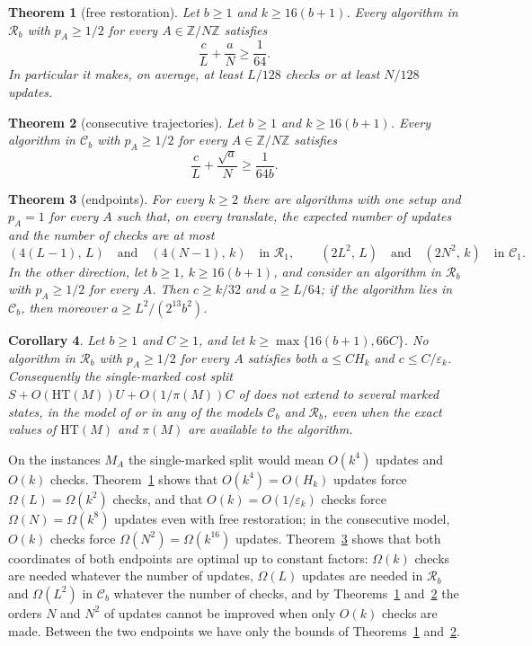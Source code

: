 \documentclass{amsart}
\theoremstyle{plain}
\newtheorem{theorem}{Theorem}[section]
\newtheorem{corollary}[theorem]{Corollary}
\theoremstyle{definition}
\theoremstyle{remark}
\newcommand{\Z}{\mathbb{Z}}
\newcommand{\eps}{\varepsilon}
\newcommand{\res}{\mathcal{R}}
\newcommand{\con}{\mathcal{C}}
\newcommand{\HT}{\mathrm{HT}}
\begin{document}
\begin{theorem}[free restoration]\label{thm:main}
Let $b\ge 1$ and $k\ge 16(b+1)$. Every algorithm in $\res_b$ with $p_A\ge 1/2$ for every $A\in\Z/N\Z$ satisfies
\[
\frac cL+\frac aN\ge \frac1{64}.
\]
In particular it makes, on average, at least $L/128$ checks or at least $N/128$ updates.
\end{theorem}

\begin{theorem}[consecutive trajectories]\label{thm:consecutive}
Let $b\ge 1$ and $k\ge 16(b+1)$. Every algorithm in $\con_b$ with $p_A\ge 1/2$ for every $A\in\Z/N\Z$ satisfies
\[
\frac cL+\frac{\sqrt a}{N}\ge \frac1{64b}.
\]
\end{theorem}

\begin{theorem}[endpoints]\label{thm:endpoints}
For every $k\ge 2$ there are algorithms with one setup and $p_A=1$ for every $A$ such that, on every translate, the expected number of updates and the number of checks are at most
\[
(4(L-1),\,L)\quad\text{and}\quad (4(N-1),\,k)\quad\text{in } \res_1,\qquad
(2L^2,\,L)\quad\text{and}\quad (2N^2,\,k)\quad\text{in } \con_1 .
\]
In the other direction, let $b\ge 1$, $k\ge 16(b+1)$, and consider an algorithm in $\res_b$ with $p_A\ge 1/2$ for every $A$. Then $c\ge k/32$ and $a\ge L/64$; if the algorithm lies in $\con_b$, then moreover $a\ge L^2/(2^{13}b^2)$.
\end{theorem}

\begin{corollary}\label{cor:nouniform}
Let $b\ge 1$ and $C\ge 1$, and let $k\ge\max\{16(b+1),66C\}$. No algorithm in $\res_b$ with $p_A\ge 1/2$ for every $A$ satisfies both $a\le C H_k$ and $c\le C/\eps_k$. Consequently the single-marked cost split $S+O(\HT(M))U+O(1/\pi(M))C$ of \cite{DH,AC} does not extend to several marked states, in the model of \cite{AC} or in any of the models $\con_b$ and $\res_b$, even when the exact values of $\HT(M)$ and $\pi(M)$ are available to the algorithm.
\end{corollary}

On the instances $M_A$ the single-marked split would mean $O(k^4)$ updates and $O(k)$ checks. Theorem~\ref{thm:main} shows that $O(k^4)=O(H_k)$ updates force $\Omega(L)=\Omega(k^2)$ checks, and that $O(k)=O(1/\eps_k)$ checks force $\Omega(N)=\Omega(k^8)$ updates even with free restoration; in the consecutive model, $O(k)$ checks force $\Omega(N^2)=\Omega(k^{16})$ updates. Theorem~\ref{thm:endpoints} shows that both coordinates of both endpoints are optimal up to constant factors: $\Omega(k)$ checks are needed whatever the number of updates, $\Omega(L)$ updates are needed in $\res_b$ and $\Omega(L^2)$ in $\con_b$ whatever the number of checks, and by Theorems~\ref{thm:main} and~\ref{thm:consecutive} the orders $N$ and $N^2$ of updates cannot be improved when only $O(k)$ checks are made. Between the two endpoints we have only the bounds of Theorems~\ref{thm:main} and~\ref{thm:consecutive}.
\end{document}

